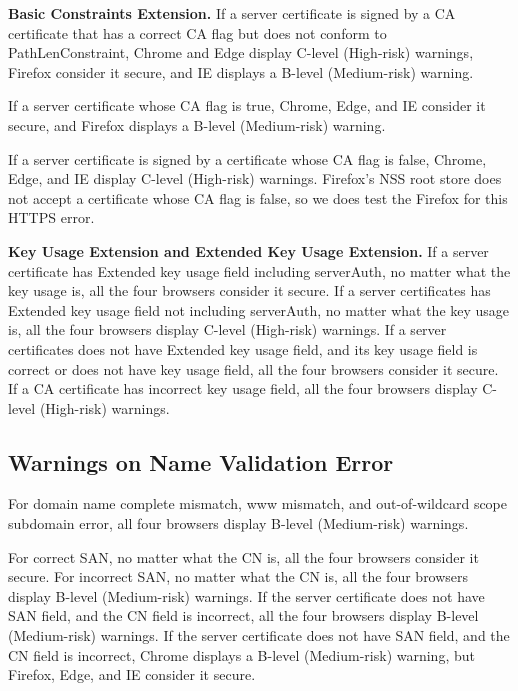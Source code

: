 \textbf{Basic Constraints Extension.}
    If a server certificate is signed by a CA certificate that has a correct CA flag but does not conform to PathLenConstraint,
    Chrome and Edge display C-level (High-risk) warnings,
    Firefox consider it secure, and IE displays a B-level (Medium-risk) warning.

    If a server certificate whose CA flag is true,
    Chrome, Edge, and IE consider it secure,
    and Firefox displays a B-level (Medium-risk) warning.

    If a server certificate is signed by a certificate whose CA flag is false,
     Chrome, Edge, and IE display C-level (High-risk) warnings.
     Firefox's NSS root store does not accept a certificate whose CA flag is false, so we does test the Firefox for this HTTPS error.

\textbf{Key Usage Extension and Extended Key Usage Extension.}
    If a server certificate has Extended key usage field including serverAuth, no matter what the key usage is,
        all the four browsers consider it secure.
    If a server certificates has Extended key usage field not including serverAuth, no matter what the key usage is,
        all the four browsers display C-level (High-risk) warnings.
    If a server certificates does not have Extended key usage field, and its key usage field is correct or does not have key usage field,
        all the four browsers consider it secure.
    If a CA certificate has incorrect key usage field,
        all the four browsers display C-level (High-risk) warnings.

\subsection{Warnings on Name Validation Error}
    For domain name complete mismatch, www mismatch, and out-of-wildcard scope subdomain error,
    all four browsers display B-level (Medium-risk) warnings.

    For correct SAN, no matter what the CN is, all the four browsers consider it secure.
    For incorrect SAN, no matter what the CN is, all the four browsers display B-level (Medium-risk) warnings.
    If the server certificate does not have SAN field, and the CN field is incorrect, all the four browsers display B-level (Medium-risk) warnings.
    If the server certificate does not have SAN field, and the CN field is incorrect,
    Chrome displays a B-level (Medium-risk) warning,
            but Firefox, Edge, and IE consider it secure.

